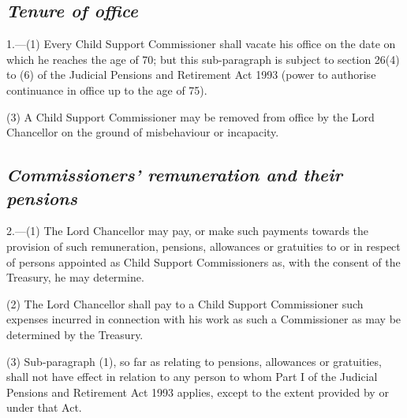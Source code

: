\documentclass[12pt,a4paper]{article}
\begin{document}

\subsection*{\itshape Tenure of office}

1.---(1) Every Child Support Commissioner shall vacate his office 
on the date on which he reaches the age of 70; but this sub-paragraph is subject to section 26(4) to (6) of the Judicial Pensions and Retirement Act 1993 (power to authorise continuance in office up to the age of 75).  %


(3) A Child Support Commissioner may be removed from office by the Lord Chancellor on the ground of misbehaviour or incapacity.


\subsection*{\itshape Commissioners' remuneration and their pensions}

2.---(1) The Lord Chancellor may pay, or make such payments towards the provision of such remuneration, pensions, allowances or gratuities to or in respect of persons appointed as Child Support Commissioners as, with the consent of the Treasury, he may determine.

(2) The Lord Chancellor shall pay to a Child Support Commissioner such expenses incurred in connection with his work as such a Commissioner as may be determined by the Treasury.

(3) Sub-paragraph (1), so far as relating to pensions, allowances or gratuities, shall not have effect in relation to any person to whom Part I of the Judicial Pensions and Retirement Act 1993 applies, except to the extent provided by or under that Act.
\end{document}
